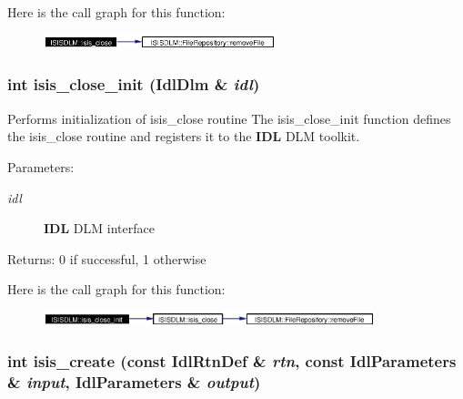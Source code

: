 Here is the call graph for this function:\begin{figure}[H]
\begin{center}
\leavevmode
\includegraphics[width=191pt]{namespaceISISDLM_a12_cgraph}
\end{center}
\end{figure}
\subsubsection{\setlength{\rightskip}{0pt plus 5cm}int isis\_\-close\_\-init (Idl\-Dlm \& {\em idl})}\label{namespaceISISDLM_a11}


Performs initialization of isis\_\-close routine The isis\_\-close\_\-init function defines the isis\_\-close routine and registers it to the {\bf IDL} DLM toolkit. \begin{Desc}
\item[Parameters:]
\begin{description}
\item[{\em idl}]{\bf IDL} DLM interface \end{description}
\end{Desc}
\begin{Desc}
\item[Returns:]0 if successful, 1 otherwise \end{Desc}


Here is the call graph for this function:\begin{figure}[H]
\begin{center}
\leavevmode
\includegraphics[width=273pt]{namespaceISISDLM_a11_cgraph}
\end{center}
\end{figure}
\subsubsection{\setlength{\rightskip}{0pt plus 5cm}int isis\_\-create (const Idl\-Rtn\-Def \& {\em rtn}, const Idl\-Parameters \& {\em input}, Idl\-Parameters \& {\em output})}\label{namespaceISISDLM_a14}


